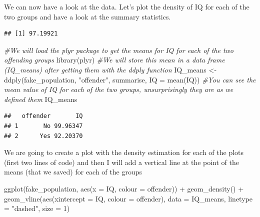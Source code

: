 \documentclass[
]{book}
\newenvironment{Shaded}{\begin{snugshade}}{\end{snugshade}}
\newcommand{\AttributeTok}[1]{\textcolor[rgb]{0.77,0.63,0.00}{#1}}
\newcommand{\CommentTok}[1]{\textcolor[rgb]{0.56,0.35,0.01}{\textit{#1}}}
\newcommand{\DecValTok}[1]{\textcolor[rgb]{0.00,0.00,0.81}{#1}}
\newcommand{\DocumentationTok}[1]{\textcolor[rgb]{0.56,0.35,0.01}{\textbf{\textit{#1}}}}
\newcommand{\FunctionTok}[1]{\textcolor[rgb]{0.00,0.00,0.00}{#1}}
\newcommand{\NormalTok}[1]{#1}
\newcommand{\OtherTok}[1]{\textcolor[rgb]{0.56,0.35,0.01}{#1}}
\newcommand{\SpecialCharTok}[1]{\textcolor[rgb]{0.00,0.00,0.00}{#1}}
\newcommand{\StringTok}[1]{\textcolor[rgb]{0.31,0.60,0.02}{#1}}
\begin{document}
We can now have a look at the data. Let's plot the density of IQ for each of the two groups and have a look at the summary statistics.

\begin{Shaded}
\end{Shaded}

\begin{verbatim}
## [1] 97.19921
\end{verbatim}

\begin{Shaded}
\begin{Highlighting}[]
\CommentTok{\#We will load the plyr package to get the means for IQ for each of the two offending groups}
\FunctionTok{library}\NormalTok{(plyr)}
\CommentTok{\#We will store this mean in a data frame (IQ\_means) after getting them with the ddply function}
\NormalTok{IQ\_means }\OtherTok{\textless{}{-}} \FunctionTok{ddply}\NormalTok{(fake\_population, }\StringTok{"offender"}\NormalTok{, summarise, }\AttributeTok{IQ =} \FunctionTok{mean}\NormalTok{(IQ))}
\CommentTok{\#You can see the mean value of IQ for each of the two groups, unsurprisingly they are as we defined them}
\NormalTok{IQ\_means}
\end{Highlighting}
\end{Shaded}

\begin{verbatim}
##   offender       IQ
## 1       No 99.96347
## 2      Yes 92.20370
\end{verbatim}

We are going to create a plot with the density estimation for each of the plots (first two lines of code) and then I will add a vertical line at the point of the means (that we saved) for each of the groups

\begin{Shaded}
\begin{Highlighting}[]
\FunctionTok{ggplot}\NormalTok{(fake\_population, }\FunctionTok{aes}\NormalTok{(}\AttributeTok{x =}\NormalTok{ IQ, }\AttributeTok{colour =}\NormalTok{ offender)) }\SpecialCharTok{+} 
  \FunctionTok{geom\_density}\NormalTok{() }\SpecialCharTok{+}
  \FunctionTok{geom\_vline}\NormalTok{(}\FunctionTok{aes}\NormalTok{(}\AttributeTok{xintercept =}\NormalTok{ IQ, }\AttributeTok{colour =}\NormalTok{ offender), }\AttributeTok{data =}\NormalTok{ IQ\_means,}
             \AttributeTok{linetype =} \StringTok{"dashed"}\NormalTok{, }\AttributeTok{size =} \DecValTok{1}\NormalTok{)}
\end{Highlighting}
\end{Shaded}
\end{document}
